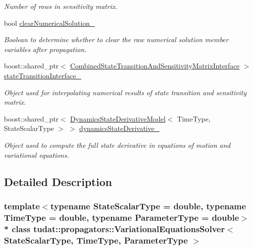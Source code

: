 \begin{DoxyCompactItemize}
\begin{DoxyCompactList}\small\item\em Number of rows in sensitivity matrix. \end{DoxyCompactList}\item 
bool \hyperlink{classtudat_1_1propagators_1_1VariationalEquationsSolver_af7c2f15b08a06114fe9a2b899e3a4382}{clear\+Numerical\+Solution\+\_\+}
\begin{DoxyCompactList}\small\item\em Boolean to determine whether to clear the raw numerical solution member variables after propagation. \end{DoxyCompactList}\item 
boost\+::shared\+\_\+ptr$<$ \hyperlink{classtudat_1_1propagators_1_1CombinedStateTransitionAndSensitivityMatrixInterface}{Combined\+State\+Transition\+And\+Sensitivity\+Matrix\+Interface} $>$ \hyperlink{classtudat_1_1propagators_1_1VariationalEquationsSolver_af3827ac779928436b6d1e8297988af97}{state\+Transition\+Interface\+\_\+}\hypertarget{classtudat_1_1propagators_1_1VariationalEquationsSolver_af3827ac779928436b6d1e8297988af97}{}\label{classtudat_1_1propagators_1_1VariationalEquationsSolver_af3827ac779928436b6d1e8297988af97}

\begin{DoxyCompactList}\small\item\em Object used for interpolating numerical results of state transition and sensitivity matrix. \end{DoxyCompactList}\item 
boost\+::shared\+\_\+ptr$<$ \hyperlink{classtudat_1_1propagators_1_1DynamicsStateDerivativeModel}{Dynamics\+State\+Derivative\+Model}$<$ Time\+Type, State\+Scalar\+Type $>$ $>$ \hyperlink{classtudat_1_1propagators_1_1VariationalEquationsSolver_a4b2adaa9bdcae6706d5413878790aa41}{dynamics\+State\+Derivative\+\_\+}
\begin{DoxyCompactList}\small\item\em Object used to compute the full state derivative in equations of motion and variational equations. \end{DoxyCompactList}\end{DoxyCompactItemize}


\subsection{Detailed Description}
\subsubsection*{template$<$typename State\+Scalar\+Type = double, typename Time\+Type = double, typename Parameter\+Type = double$>$\\*
class tudat\+::propagators\+::\+Variational\+Equations\+Solver$<$ State\+Scalar\+Type, Time\+Type, Parameter\+Type $>$}

